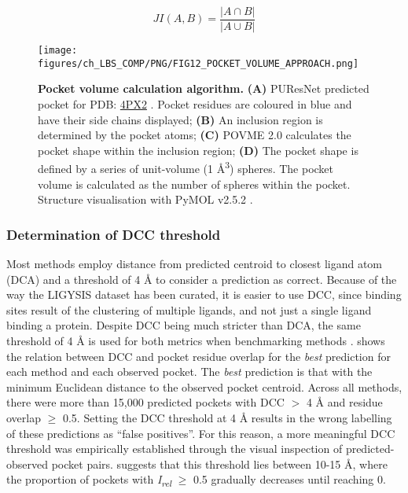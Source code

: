 \begin{equation}
JI(A, B) = \frac{|A \cap B|}{|A \cup B|}
\label{eq:jaccard_index}
\end{equation}

\begin{figure}[h]
    \centering
    \texttt{[image: figures/ch\_LBS\_COMP/PNG/FIG12\_POCKET\_VOLUME\_APPROACH.png]}
    \caption[Pocket volume calculation algorithm]{\textbf{Pocket volume calculation algorithm.} \textbf{(A)} PUResNet predicted pocket for PDB: \href{https://www.ebi.ac.uk/pdbe/entry/pdb/4PX2}{4PX2} \cite{PDB_4PX2}. Pocket residues are coloured in blue and have their side chains displayed; \textbf{(B)} An inclusion region is determined by the pocket atoms; \textbf{(C)} POVME 2.0 calculates the pocket shape within the inclusion region; \textbf{(D)} The pocket shape is defined by a series of unit-volume (1 \AA{}\textsuperscript{3}) spheres. The pocket volume is calculated as the number of spheres within the pocket. Structure visualisation with PyMOL v2.5.2 \cite{SCHRODINGER_2015_PYMOL}.}
    \label{fig:protein_volume_approach}
\end{figure}

\vspace{-12pt} %
\vspace{-12pt} %

\subsubsection{Determination of DCC threshold}
\label{subsub:determining_dcc_thresh}

Most methods employ distance from predicted centroid to closest ligand atom  (DCA) and a threshold of 4 \AA{} to consider a prediction as correct. Because of the way the LIGYSIS dataset has been curated, it is easier to use DCC, since binding sites result of the clustering of multiple ligands, and not just a single ligand binding a protein. Despite DCC being much stricter than DCA, the same threshold of 4 \AA{} is used for both metrics when benchmarking methods \cite{AGGARWAL_2022_DEEPPOCKET, SESTAK_2024_VNEGNN, KANDEL_2021_PURESNET}.  shows the relation between DCC and pocket residue overlap for the \textit{best} prediction for each method and each observed pocket. The \textit{best} prediction is that with the minimum Euclidean distance to the observed pocket centroid. Across all methods, there were more than 15,000 predicted pockets with DCC $>$ 4 \AA{} and residue overlap $\geq$ 0.5. Setting the DCC threshold at 4 \AA{} results in the wrong labelling of these predictions as ``false positives''. For this reason, a more meaningful DCC threshold was empirically established through the visual inspection of predicted-observed pocket pairs.  suggests that this threshold lies between 10-15 \AA{}, where the proportion of pockets with \textit{I\textsubscript{rel}} $\geq$ 0.5 gradually decreases until reaching 0.

